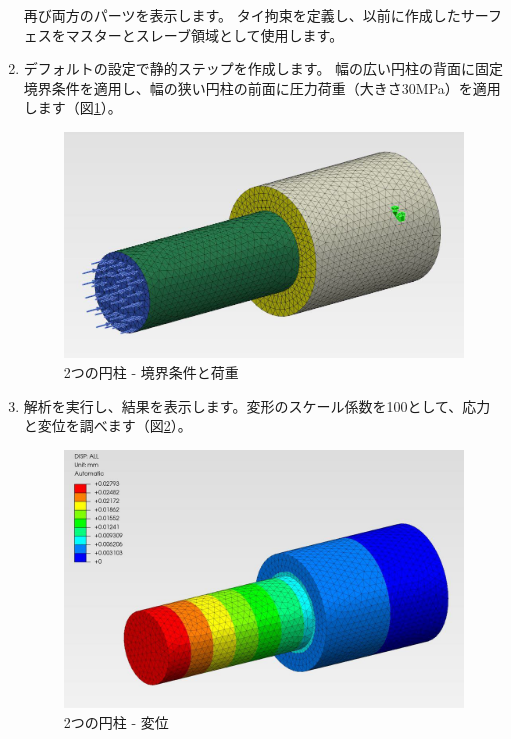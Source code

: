 \begin{enumerate}
  再び両方のパーツを表示します。
  タイ拘束を定義し、以前に作成したサーフェスをマスターとスレーブ領域として使用します。
\item
  デフォルトの設定で静的ステップを作成します。
  幅の広い円柱の背面に固定境界条件を適用し、幅の狭い円柱の前面に圧力荷重（大きさ30MPa）を適用します（図\ref{fig:05-02}）。
	\begin{figure}[H]
	\centering
	\includegraphics[width=135mm]{fig/05-02.png}
	\caption{2つの円柱 - 境界条件と荷重}
	\label{fig:05-02}
	\end{figure}
\vspace{-\baselineskip}
\item
  解析を実行し、結果を表示します。変形のスケール係数を100として、応力と変位を調べます（図\ref{fig:05-03}）。
	\begin{figure}[H]
	\centering
	\includegraphics[width=135mm]{fig/05-03.png}
	\caption{2つの円柱 - 変位}
	\label{fig:05-03}
	\end{figure}
\vspace{-\baselineskip}
\end{enumerate}